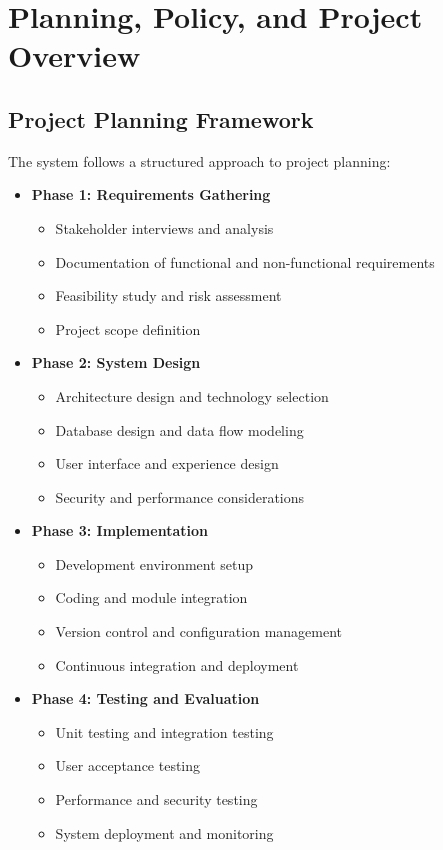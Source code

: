 \documentclass[12pt,a4paper]{article}
\begin{document}
\section{Planning, Policy, and Project Overview}

\subsection{Project Planning Framework}
The system follows a structured approach to project planning:

\begin{itemize}
    \item \textbf{Phase 1: Requirements Gathering}
    \begin{itemize}
        \item Stakeholder interviews and analysis
        \item Documentation of functional and non-functional requirements
        \item Feasibility study and risk assessment
        \item Project scope definition
    \end{itemize}
    
    \item \textbf{Phase 2: System Design}
    \begin{itemize}
        \item Architecture design and technology selection
        \item Database design and data flow modeling
        \item User interface and experience design
        \item Security and performance considerations
    \end{itemize}
    
    \item \textbf{Phase 3: Implementation}
    \begin{itemize}
        \item Development environment setup
        \item Coding and module integration
        \item Version control and configuration management
        \item Continuous integration and deployment
    \end{itemize}
    
    \item \textbf{Phase 4: Testing and Evaluation}
    \begin{itemize}
        \item Unit testing and integration testing
        \item User acceptance testing
        \item Performance and security testing
        \item System deployment and monitoring
    \end{itemize}
\end{itemize}
\end{document}
